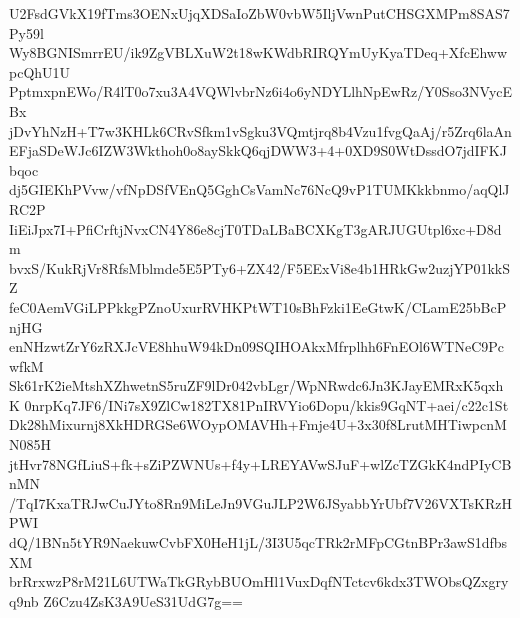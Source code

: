 U2FsdGVkX19fTms3OENxUjqXDSaIoZbW0vbW5IljVwnPutCHSGXMPm8SAS7Py59l
Wy8BGNISmrrEU/ik9ZgVBLXuW2t18wKWdbRIRQYmUyKyaTDeq+XfcEhwwpcQhU1U
PptmxpnEWo/R4lT0o7xu3A4VQWlvbrNz6i4o6yNDYLlhNpEwRz/Y0Sso3NVycEBx
jDvYhNzH+T7w3KHLk6CRvSfkm1vSgku3VQmtjrq8b4Vzu1fvgQaAj/r5Zrq6laAn
EFjaSDeWJc6IZW3Wkthoh0o8aySkkQ6qjDWW3+4+0XD9S0WtDssdO7jdIFKJbqoc
dj5GIEKhPVvw/vfNpDSfVEnQ5GghCsVamNc76NcQ9vP1TUMKkkbnmo/aqQlJRC2P
IiEiJpx7I+PfiCrftjNvxCN4Y86e8cjT0TDaLBaBCXKgT3gARJUGUtpl6xc+D8dm
bvxS/KukRjVr8RfsMblmde5E5PTy6+ZX42/F5EExVi8e4b1HRkGw2uzjYP01kkSZ
feC0AemVGiLPPkkgPZnoUxurRVHKPtWT10sBhFzki1EeGtwK/CLamE25bBcPnjHG
enNHzwtZrY6zRXJcVE8hhuW94kDn09SQIHOAkxMfrplhh6FnEOl6WTNeC9PcwfkM
Sk61rK2ieMtshXZhwetnS5ruZF9lDr042vbLgr/WpNRwdc6Jn3KJayEMRxK5qxhK
0nrpKq7JF6/INi7sX9ZlCw182TX81PnIRVYio6Dopu/kkis9GqNT+aei/c22c1St
Dk28hMixurnj8XkHDRGSe6WOypOMAVHh+Fmje4U+3x30f8LrutMHTiwpcnMN085H
jtHvr78NGfLiuS+fk+sZiPZWNUs+f4y+LREYAVwSJuF+wlZcTZGkK4ndPIyCBnMN
/TqI7KxaTRJwCuJYto8Rn9MiLeJn9VGuJLP2W6JSyabbYrUbf7V26VXTsKRzHPWI
dQ/1BNn5tYR9NaekuwCvbFX0HeH1jL/3I3U5qcTRk2rMFpCGtnBPr3awS1dfbsXM
brRrxwzP8rM21L6UTWaTkGRybBUOmHl1VuxDqfNTctcv6kdx3TWObsQZxgryq9nb
Z6Czu4ZsK3A9UeS31UdG7g==
